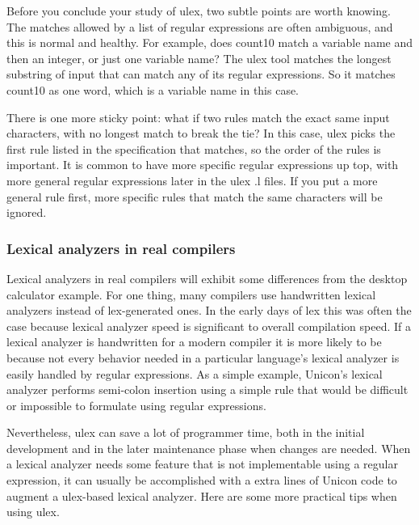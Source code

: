Before you conclude your study of \textsf{ulex}, two subtle points are
worth knowing. The matches allowed by a list of regular expressions are
often ambiguous, and this is normal and healthy. For example, does
\textsf{count10} match a variable name and then an integer, or just one
variable name? The \textsf{ulex} tool matches the longest substring of
input that can match any of its regular expressions. So it matches
\textsf{count10} as one word, which is a variable name in this case.

There is one more sticky point: what if two rules match the exact same
input characters, with no longest match to break the tie? In this case,
\textsf{ulex} picks the first rule listed in the specification that
matches, so the order of the rules is important.  It is common to have
more specific regular expressions up top, with more general regular
expressions later in the ulex .l files. If you put a more general rule
first, more specific rules that match the same characters will be ignored.

\subsubsection{Lexical analyzers in real compilers}

Lexical analyzers in real compilers will exhibit some differences from
the desktop calculator example. For one thing, many compilers use
handwritten lexical analyzers instead of lex-generated ones. In the
early days of lex this was often the case because lexical analyzer speed is
significant to overall compilation speed. If a lexical analyzer is
handwritten for a modern compiler it is more likely to be because not every
behavior needed in a particular language's lexical analyzer is easily
handled by regular expressions. As a simple example, Unicon's lexical
analyzer performs semi-colon insertion using a simple rule that would
be difficult or impossible to formulate using regular expressions.

Nevertheless, ulex can save a lot of programmer time, both in the
initial development and in the later maintenance phase when
changes are needed. When a lexical analyzer needs some feature that
is not implementable using a regular expression, it can usually be
accomplished with a extra lines of Unicon code to augment a ulex-based
lexical analyzer. Here are some more practical tips when using ulex.

